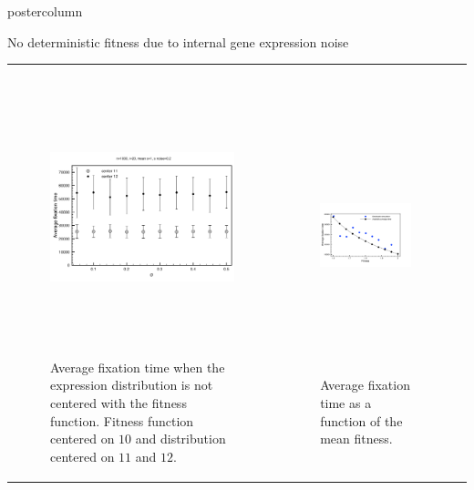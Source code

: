 \documentclass[final,hyperref={pdfpagelabels=false}]{beamer}
\begin{document}
\begin{frame}
\begin{columns}
\begin{column}{.49\textwidth}
\begin{beamercolorbox}[center,wd=\textwidth]{postercolumn}
\begin{minipage}[T]{.95\textwidth}
{\begin{block}{No deterministic fitness due to internal gene expression noise}
\begin{tabularx}{\linewidth}{ZZZ}
\begin{figure}
\includegraphics[width=11cm,height=8cm]{images/nocenteredVsSigma.pdf}
\caption{Average fixation time when the expression distribution is not centered with the fitness function. Fitness function centered on $10$ and distribution centered on $11$ and $12$.}
\end{figure}
&
\begin{figure}
\includegraphics[width=11cm,height=8cm]{images/AveragetimeFitness.pdf}
\caption{Average fixation time as a function of the mean fitness.}
\end{figure}
\\
\end{tabularx}
\end{block}
\vfill                     
          }
        \end{minipage}
      \end{beamercolorbox}
    \end{column}


\end{columns}
\end{frame}
\end{document}
